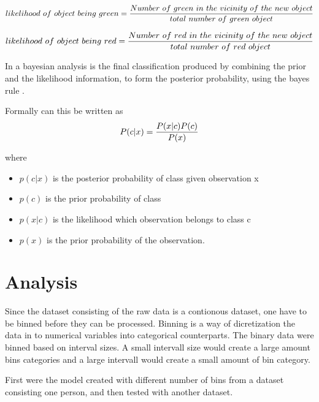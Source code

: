 \documentclass[10pt,a4paper]{article}
\begin{document}
\begin{equation}
\centering
likelihood~of~object~being~green = \frac{Number~of~green~in~the~vicinity~of~the~new~object }{total~number~of~green~object}
\end{equation}

\begin{equation}
\centering
likelihood~of~object~being~red = \frac{Number~of~red~in~the~vicinity~of~the~new~object }{total~number~of~red~object}
\end{equation}


In a bayesian analysis is the final classification produced by combining the prior and the likelihood information, to form the posterior probability, using the bayes rule . 


Formally can this be written as 
\begin{equation}
\centering
P(c|x) = \frac{P(x|c)P(c)}{P(x)}
\end{equation}

where 
\begin{itemize}
\item	$p(c|x)$ is the posterior probability of class given observation x
\item	$p(c)$ is the prior probability of class
\item   $p(x|c)$ is the likelihood which observation belongs to class  c
\item   $p(x)$ is the prior probability of the observation. 
\end{itemize}





 

\section{Analysis}
Since the dataset consisting of the raw data is a contionous dataset, one have to be binned before they can be processed. Binning is a way of dicretization the data in to numerical variables into categorical counterparts. The binary data were binned based on interval sizes.  A small intervall size would create a large amount bins categories and a large intervall would create a small amount of bin category.  

First were the model created with different number of bins from a dataset consisting one person, and then tested with another dataset.
\end{document}
